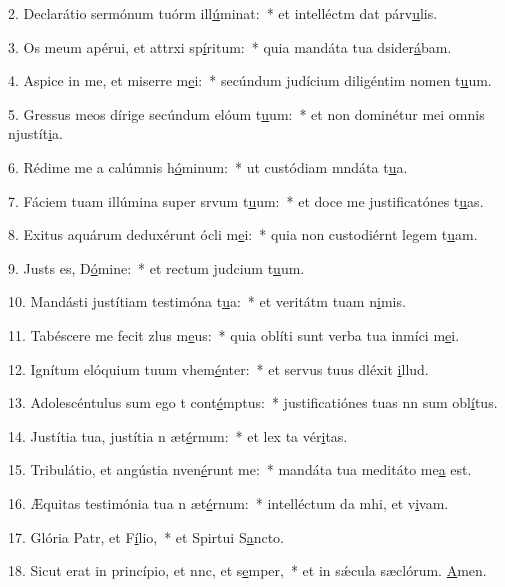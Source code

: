 2. Declarátio sermónum tuórm ill\uline{ú}minat:~* et intelléctm dat párv\uline{u}lis.\par 
3. Os meum apérui, et attrxi sp\uline{í}ritum:~* quia mandáta tua dsider\uline{á}bam.\par 
4. Aspice in me, et miserre m\uline{e}i:~* secúndum judícium diligéntim nomen t\uline{u}um.\par 
5. Gressus meos dírige secúndum elóum t\uline{u}um:~* et non dominétur mei omnis njustít\uline{i}a.\par 
6. Rédime me a calúmnis h\uline{ó}minum:~* ut custódiam mndáta t\uline{u}a.\par 
7. Fáciem tuam illúmina super srvum t\uline{u}um:~* et doce me justificatónes t\uline{u}as.\par 
8. Exitus aquárum deduxérunt ócli m\uline{e}i:~* quia non custodiérnt legem t\uline{u}am.\par 
9. Justs es, D\uline{ó}mine:~* et rectum judcium t\uline{u}um.\par 
10. Mandásti justítiam testimóna t\uline{u}a:~* et veritátm tuam n\uline{i}mis.\par 
11. Tabéscere me fecit zlus m\uline{e}us:~* quia oblíti sunt verba tua inmíci m\uline{e}i.\par 
12. Ignítum elóquium tuum vhem\uline{é}nter:~* et servus tuus dléxit \uline{i}llud.\par 
13. Adolescéntulus sum ego t cont\uline{é}mptus:~* justificatiónes tuas nn sum obl\uline{í}tus.\par 
14. Justítia tua, justítia n æt\uline{é}rnum:~* et lex ta vér\uline{i}tas.\par 
15. Tribulátio, et angústia nven\uline{é}runt me:~* mandáta tua meditáto me\uline{a} est.\par 
16. Æquitas testimónia tua n æt\uline{é}rnum:~* intelléctum da mhi, et v\uline{i}vam.\par 
17. Glória Patr, et F\uline{í}lio,~* et Spirtui S\uline{a}ncto.\par 
18. Sicut erat in princípio, et nnc, et s\uline{e}mper,~* et in sǽcula sæclórum. \uline{A}men.\par 
